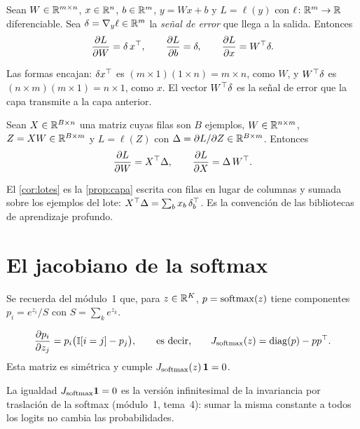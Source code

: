 \begin{proposicion}\label{prop:capa}
Sean $W\in\mathbb{R}^{m\times n}$, $x\in\mathbb{R}^{n}$, $b\in\mathbb{R}^{m}$, $y=Wx+b$ y $L=\ell(y)$ con $\ell\colon\mathbb{R}^{m}\to\mathbb{R}$ diferenciable. Sea $\delta=\nabla_y\ell\in\mathbb{R}^{m}$ la \emph{señal de error} que llega a la salida. Entonces
\[
\frac{\partial L}{\partial W}=\delta\,x^{\top},\qquad
\frac{\partial L}{\partial b}=\delta,\qquad
\frac{\partial L}{\partial x}=W^{\top}\delta.
\]
\end{proposicion}

Las formas encajan: $\delta x^{\top}$ es $(m\times 1)(1\times n)=m\times n$, como $W$, y $W^{\top}\delta$ es $(n\times m)(m\times 1)=n\times 1$, como $x$. El vector $W^{\top}\delta$ es la señal de error que la capa transmite a la capa anterior.

\addtocounter{definicion}{1}%

\begin{corolario}\label{cor:lotes}
Sean $X\in\mathbb{R}^{B\times n}$ una matriz cuyas filas son $B$ ejemplos, $W\in\mathbb{R}^{n\times m}$, $Z=XW\in\mathbb{R}^{B\times m}$ y $L=\ell(Z)$ con $\Delta=\partial L/\partial Z\in\mathbb{R}^{B\times m}$. Entonces
\[
\frac{\partial L}{\partial W}=X^{\top}\Delta,\qquad\frac{\partial L}{\partial X}=\Delta\,W^{\top}.
\]
\end{corolario}

El \cref{cor:lotes} es la \cref{prop:capa} escrita con filas en lugar de columnas y sumada sobre los ejemplos del lote: $X^{\top}\Delta=\sum_b x_b\,\delta_b^{\top}$. Es la convención de las bibliotecas de aprendizaje profundo.

\addtocounter{definicion}{1}%

\section{El jacobiano de la softmax}

Se recuerda del módulo~1 que, para $z\in\mathbb{R}^{K}$, $p=\operatorname{softmax}(z)$ tiene componentes $p_i=e^{z_i}/S$ con $S=\sum_k e^{z_k}$.

\begin{proposicion}\label{prop:jac-softmax}
\[
\frac{\partial p_i}{\partial z_j}=p_i\bigl(\mathbb{I}[i=j]-p_j\bigr),\qquad\text{es decir,}\qquad J_{\operatorname{softmax}}(z)=\operatorname{diag}(p)-pp^{\top}.
\]
Esta matriz es simétrica y cumple $J_{\operatorname{softmax}}(z)\,\mathbf{1}=0$.
\end{proposicion}

La igualdad $J_{\operatorname{softmax}}\mathbf{1}=0$ es la versión infinitesimal de la invariancia por traslación de la softmax (módulo~1, tema~4): sumar la misma constante a todos los logits no cambia las probabilidades.

